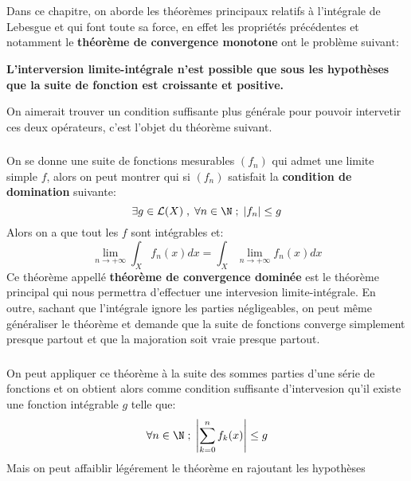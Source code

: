 \chapter*{} %

Dans ce chapitre, on aborde les théorèmes principaux relatifs à l'intégrale de Lebesgue et qui font toute sa force, en effet les propriétés précédentes et notamment le \textbf{théorème de convergence monotone} ont le problème suivant:
\begin{center}
   \textbf{L'interversion limite-intégrale n'est possible que sous les hypothèses que la suite de fonction est croissante et positive.}
\end{center}
On aimerait trouver un condition suffisante plus générale pour pouvoir intervetir ces deux opérateurs, c'est l'objet du théorème suivant.

\subsection*{}
On se donne une suite de fonctions mesurables \((f_n)\) qui admet une limite simple \(f\), alors on peut montrer qui si \((f_n)\) satisfait la \textbf{condition de domination} suivante:
\[
   \exists g \in \mathcal{L}(X) \; , \; \forall n \in \N \; ; \; |f_n| \leq g
\]
Alors on a que tout les \(f\) sont intégrables et:
\[
   \lim_{n \rightarrow +\infty} \int_X f_n(x) dx = \int_X \lim_{n \rightarrow +\infty} f_n(x) dx
\]
Ce théorème appellé \textbf{théorème de convergence dominée} est le théorème principal qui nous permettra d'effectuer une intervesion limite-intégrale. En outre, sachant que l'intégrale ignore les parties négligeables, on peut même généraliser le théorème et demande que la suite de fonctions converge simplement presque partout et que la majoration soit vraie presque partout.

\subsection*{}
On peut appliquer ce théorème à la suite des sommes parties d'une série de fonctions et on obtient alors comme condition suffisante d'intervesion qu'il existe une fonction intégrable \(g\) telle que:
\[
   \forall n \in \N \; ; \; \left|\sum_{k=0}^{n} f_k(x)\right| \leq g
\]
Mais on peut affaiblir légérement le théorème en rajoutant les hypothèses 
